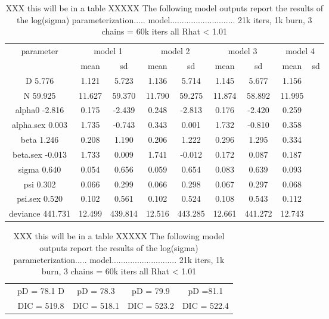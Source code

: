 \begin{table}[htp]
\centering
\caption{XXX this will be in a table XXXXX
The following model outputs report the results of the log(sigma)
parameterization.....
model............................
21k iters, 1k burn, 3 chains = 60k iters
all Rhat < 1.01
}
\begin{tabular}{ccccccccc}
parameter & \multicolumn{2}{c}{model 1} &
\multicolumn{2}{c}{model 2} &
\multicolumn{2}{c}{model 3} &
\multicolumn{2}{c}{model 4}  \\
        &    mean &   sd &      mean &   sd &      mean &   sd &   mean&     sd \\
D           5.776 &  1.121&  5.723 &  1.136 &  5.714 &  1.145 & 5.677&   1.156 \\
N          59.925 & 11.627&  59.370&  11.790&  59.275&  11.874& 58.892&  11.995 \\
alpha0     -2.816 &  0.175&  -2.439&   0.248&  -2.813&   0.176& -2.420&   0.259 \\
alpha.sex   0.003 &  1.735&  -0.743&   0.343&   0.001&   1.732& -0.810&   0.358 \\
beta        1.246 &  0.208&   1.190&   0.206&   1.222&   0.296& 1.295&   0.334 \\
beta.sex   -0.013 &  1.733&   0.009&   1.741&  -0.012&   0.172& 0.087&   0.187 \\
sigma       0.640 &  0.054&   0.656&   0.059&  0.654 &  0.083 &  0.639&  0.093 \\
psi         0.302 &  0.066&   0.299&   0.066&  0.298 &  0.067 &  0.297&  0.068 \\
psi.sex     0.520 &  0.102&   0.561&   0.102&  0.524 &  0.108 &  0.543&  0.112 \\
deviance  441.731 & 12.499& 439.814&  12.516& 443.285&  12.661&441.272&  12.743 \\
\end{tabular}
\begin{tabular}{ccccccccc}
  & \multicolumn{2}{c}{pD = 78.1 D} &\multicolumn{2}{c}{pD = 78.3} &
\multicolumn{2}{c}{pD = 79.9} & \multicolumn{2}{c}{pD =81.1}  \\
  & \multicolumn{2}{c}{DIC = 519.8} &\multicolumn{2}{c}{DIC = 518.1} &    
\multicolumn{2}{c}{DIC = 523.2} &     \multicolumn{2}{c}{DIC = 522.4} 
\end{tabular}
\label{gof.tab.dic}
\end{table}
















